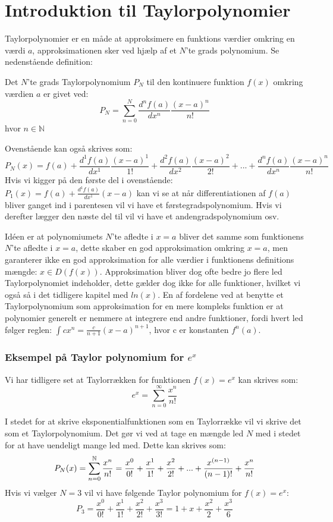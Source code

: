 \chapter{Introduktion til Taylorpolynomier}
\label{ch:tp}
Taylorpolynomier er en måde at approksimere en funktions værdier omkring en værdi $a$, 
approksimationen sker ved hjælp af et $N$'te grads polynomium. Se nedenstående definition: 
\begin{defn}
    Det $N$'te grads Taylorpolynomium $P_N$ til den kontinuere funktion $f(x)$ omkring værdien $a$ er givet ved:
    \[
    P_N = \sum^{N}_{n=0} \frac{d^n f(a)}{dx^n}\frac{(x-a)^{n}}{n!}
    \]
    hvor $n \in \mathbb{N}$
\end{defn}
\label{def:taylorPolynomium}
Ovenstående kan også skrives som:
    \[
    P_N(x)=f(a)+\frac{d^1 f(a)}{dx^1} \frac{(x-a)^{1}}{1!}+\frac{d^2 f(a)}{dx^2} \frac{(x-a)^{2}}{2!}+...+\frac{d^n f(a)}{dx^n} \frac{(x-a)^{n}}{n!}
    \]
Hvis vi kigger på den første del i ovenstående: $P_1(x)=f(a)+\frac{d^1 f(a)}{dx^1}(x-a)$ kan vi se at når differentiationen af $f(a)$ bliver ganget ind i parentesen vil vi have et førstegradspolynomium. 
Hvis vi derefter lægger den næste del til vil vi have et andengradspolynomium osv. 

Idéen er at polynomiumets $N$'te afledte i $x = a$ bliver det samme som funktionens $N$'te afledte i $x = a$, 
dette skaber en god approksimation omkring $x = a$, men garanterer ikke en god approksimation 
for alle værdier i funktionens definitions mængde: $x \in D(f(x))$. Approksimation bliver dog ofte bedre jo 
flere led Taylorpolynomiet indeholder, dette gælder dog ikke for alle funktioner, hvilket vi også så i det tidligere kapitel med $ln(x)$.
En af fordelene ved at benytte et Taylorpolynomium som approksimation for en mere kompleks funktion
er at polynomier generelt er nemmere at integrere end andre funktioner, fordi hvert led følger reglen: $\int c x^n = \frac{c}{n + 1}(x-a)^{n + 1}$, hvor c er konstanten $f^n(a)$.


\subsection*{Eksempel på Taylor polynomium for $e^x$}
Vi har tidligere set at Taylorrækken for funktionen $f(x)=e^x$ kan skrives som:
\[
e^x=\sum^{\infty}_{n=0}\frac{x^n}{n!}
\]

I stedet for at skrive eksponentialfunktionen som en Taylorrække vil vi skrive det som et Taylorpolynomium. Det gør vi ved at tage en mængde led $N$ med  i stedet for at have uendeligt mange led med. Dette kan skrives som:
\[
P_N(x)=\sum^{\mathbb{N}}_{n=0}\frac{x^n}{n!}=\frac{x^0}{0!}+\frac{x^1}{1!}+\frac{x^2}{2!}+...+\frac{x^{(n-1)}}{(n-1)!}+\frac{x^n}{n!}
\]
Hvis vi vælger $N=3$ vil vi have følgende Taylor polynomium for $f(x)=e^x$:
\[
P_3=\frac{x^0}{0!}+\frac{x^1}{1!}+\frac{x^2}{2!}+\frac{x^3}{3!}=1+x+\frac{x^2}{2}+\frac{x^3}{6}
\]

